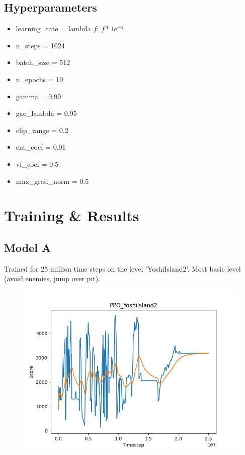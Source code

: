 \documentclass{article}
\begin{document}
    \subsection{Hyperparameters}
    \begin{itemize}
        \item learning\_rate = lambda $f$: $f * 1e^{-4}$
        \item n\_steps = 1024
        \item batch\_size = 512
        \item n\_epochs = 10
        \item gamma = 0.99
        \item gae\_lambda = 0.95
        \item clip\_range = 0.2
        \item ent\_coef = 0.01
        \item vf\_coef = 0.5
        \item max\_grad\_norm = 0.5
    \end{itemize}

    \section{Training \& Results}
    \subsection{Model A}
    Trained for 25 million time steps on the level 'YoshiIsland2'.
    Most basic level (avoid enemies, jump over pit).
    \begin{figure}[H]
        \centering
        \includegraphics[width=\textwidth]{plot_model_a.png}
    \end{figure}
\end{document}
